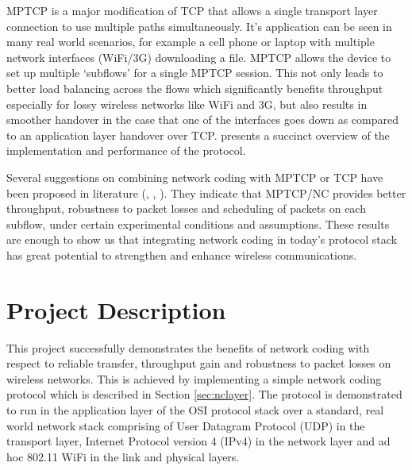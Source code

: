 \documentclass[12pt,a4paper,twoside,openright]{report}
\begin{document}
MPTCP is a major modification of TCP that allows a single transport layer connection to use multiple paths simultaneously. It's application can be seen in many real world scenarios, for example a cell phone or laptop with multiple network interfaces (WiFi/3G) downloading a file. MPTCP allows the device to set up multiple `subflows' for a single MPTCP session. This not only leads to better load balancing across the flows which significantly benefits throughput especially for lossy wireless networks like WiFi and 3G, but also results in smoother handover in the case that one of the interfaces goes down as compared to an application layer handover over TCP. \cite{mptcp-over} presents a succinct overview of the implementation and performance of the protocol.  

Several suggestions on combining network coding with MPTCP or TCP have been proposed in literature (\cite{mptcp-nc-mesh}, \cite{mptcpnc}, \cite{tcpnc}). They indicate that MPTCP/NC provides better throughput, robustness to packet losses and scheduling of packets on each subflow, under certain experimental conditions and assumptions. These results are enough to show us that integrating network coding in today's protocol stack has great potential to strengthen and enhance wireless communications. 

\section{Project Description}


This project successfully demonstrates the benefits of network coding with respect to reliable transfer, throughput gain and robustness to packet losses on wireless networks. This is achieved by implementing a simple network coding protocol which is described in Section \ref{sec:nclayer}. The protocol is demonstrated to run in the application layer of the OSI protocol stack over a standard, real world network stack comprising of User Datagram Protocol (UDP) in the transport layer, Internet Protocol version 4 (IPv4) in the network layer and ad hoc 802.11 WiFi in the link and physical layers. 
\end{document}
